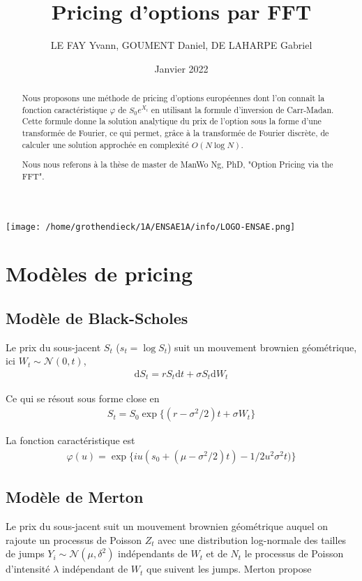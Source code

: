 \documentclass{article}
\begin{document}
\title{Pricing d'options par FFT}
\author{LE FAY Yvann, GOUMENT Daniel, DE LAHARPE Gabriel}
\date{Janvier 2022}
\maketitle
\begin{center}
	\texttt{[image: /home/grothendieck/1A/ENSAE1A/info/LOGO-ENSAE.png]}
\end{center}
\begin{abstract}
	Nous proposons une méthode de pricing d'options européennes dont l'on connaît la fonction caractéristique $\varphi$ de $S_0e^{X_t}$ en utilisant la formule d'inversion de Carr-Madan. Cette formule donne la solution analytique du prix de l'option sous la forme d'une transformée de Fourier, ce qui permet, grâce à la transformée de Fourier discrète, de calculer une solution approchée en complexité $O(N\log N)$. 

	Nous nous referons à la thèse de master de ManWo Ng, PhD, "Option Pricing via the FFT".
\end{abstract}

\section{Modèles de pricing}
\subsection{Modèle de Black-Scholes}

Le prix du sous-jacent $S_t$ ($s_t = \log S_t$) suit un mouvement brownien géométrique, ici $W_t\sim \mathcal{N}(0, t)$, 
\begin{align*}
	\mathrm{d}S_t = rS_t\mathrm{d}t + \sigma S_t \mathrm{d}W_t
\end{align*}

Ce qui se résout sous forme close en
\begin{align*}
	S_t = S_0\exp\big\{(r-\sigma^2/2)t+\sigma W_t\big\}
\end{align*}

La fonction caractéristique est 
\begin{align*}
	\varphi(u) = \exp\big\{iu(s_0+(\mu-\sigma^2/2)t)-1/2u^2\sigma^2t)\big\}
\end{align*}
\subsection{Modèle de Merton}
Le prix du sous-jacent suit un mouvement brownien géométrique auquel on rajoute un processus de Poisson $Z_t$ avec une distribution log-normale des tailles de jumps $Y_i\sim \mathcal{N}(\mu, \delta^2)$ indépendants de $W_t$ et de $N_t$ le processus de Poisson d'intensité $\lambda$ indépendant de $W_t$ que suivent les jumps. Merton propose
\end{document}
